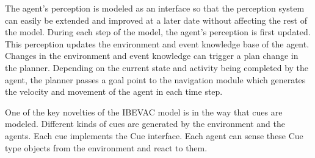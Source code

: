 The agent's perception is modeled as an interface so that the perception system can easily be extended and improved at a later date without affecting the rest of the model. During each step of the model, the agent's perception is first updated. This perception updates the environment and event knowledge base of the agent. Changes in the environment and event knowledge can trigger a plan change in the planner. Depending on the current state and activity being completed by the agent, the planner passes a goal point to the navigation module which generates the velocity and movement of the agent in each time step.

One of the key novelties of the IBEVAC model is in the way that cues are modeled. Different kinds of cues are generated by the environment and the agents. Each cue implements the Cue interface. Each agent can sense these Cue type objects from the environment and react to them.
